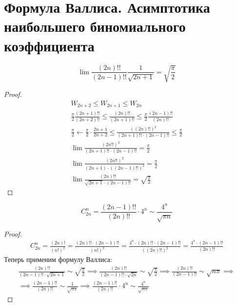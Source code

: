 \section{Формула Валлиса. Асимптотика наибольшего биномиального коэффициента}

\begin{theorem}
    \begin{equation*}
        \lim \frac{(2n)!!}{(2n - 1)!!}\frac{1}{\sqrt{2n + 1}} = \sqrt{\frac{\pi}{2}}
    \end{equation*}
\end{theorem}
\begin{proof}
  \begin{equation*}
    \begin{gathered}
      W_{2n + 2} \leq W_{2n + 1} \leq W_{2n} \\
      \frac{\pi}{2} \frac{(2n + 1)!!}{(2n + 2)!!} \leq \frac{(2n)!!}{(2n + 1)!!} \leq \frac{\pi}{2} \frac{(2n - 1)!!}{(2n)!!} \\
      \frac{\pi}{2} \leftarrow \frac{\pi}{2} \cdot \frac{2n + 1}{2n + 2} \leq \frac{((2n)!!)^2}{(2n + 1)!!\cdot(2n - 1)!!} \leq \frac{\pi}{2} \\
      \lim \frac{(2n!!)^2}{(2n + 1)!!\cdot(2n - 1)!!} = \frac{\pi}{2} \\
      \lim \frac{(2n!!)^2}{(2n + 1)\cdot((2n - 1)!!)^2} = \frac{\pi}{2} \\
      \lim \frac{(2n)!!}{\sqrt{2n + 1} \cdot (2n - 1)!!} = \sqrt{\frac{\pi}{2}}
    \end{gathered}
  \end{equation*}
\end{proof}

\begin{follow}
  \begin{equation*}
    C_{2n}^{n} = \frac{(2n - 1)!!}{(2n)!!} \cdot 4^n \sim \frac{4^n}{\sqrt{\pi n}}
  \end{equation*}
\end{follow}
\begin{proof}
  \begin{equation*}
    \begin{gathered}
      C_{2n}^{n} =
      \frac{(2n)!}{(n!)^2} =
      \frac{(2n)!! \cdot (2n - 1)!!}{(n!)^2} =
      \frac{4^n \cdot (2n)!! \cdot (2n - 1)!!}{((2n)!!)^2} =
      \frac{4^n \cdot (2n - 1)!!}{(2n)!!}
    \end{gathered}
  \end{equation*}
  Теперь применим формулу Валлиса:
  \begin{equation*}
    \begin{gathered}
        \frac{(2n)!!}{(2n - 1)!! \cdot \sqrt{2n + 1}} \sim \sqrt{\frac{\pi}{2}}
        \implies
        \frac{(2n)!!}{(2n - 1)!! \cdot \sqrt{2n}} \sim \sqrt{\frac{\pi}{2}}
        \implies
        \frac{(2n)!!}{(2n - 1)!!} \sim \sqrt{n\pi}
        \implies \\
        \implies
        \frac{(2n - 1)!!}{(2n)!!} \sim \frac{1}{\sqrt{n\pi}}
        \implies
        \frac{(2n - 1)!!}{(2n)!!} \cdot 4^n \sim \frac{4^n}{\sqrt{n\pi}}
    \end{gathered}
  \end{equation*}
\end{proof}